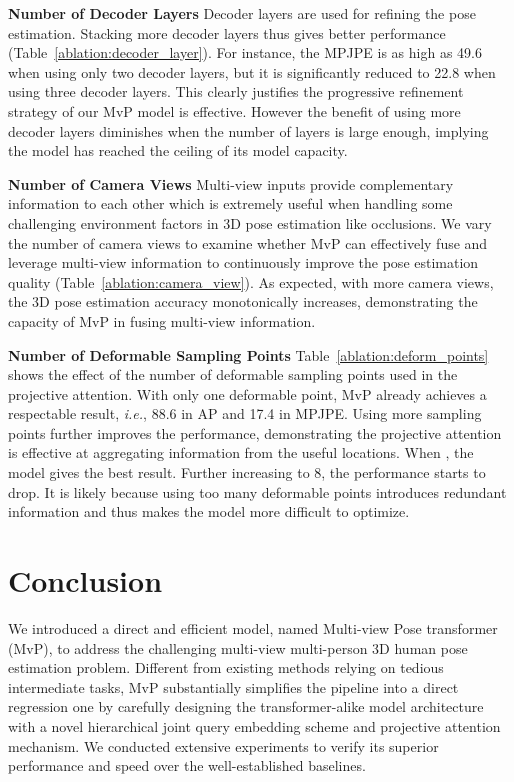 \documentclass{article}
\newcommand{\ie}{\emph{i.e.}}
\begin{document}
\textbf{Number of Decoder Layers } Decoder layers are used for refining the pose estimation.  Stacking more decoder layers thus gives better performance (Table~\ref{ablation:decoder_layer}). For instance, the MPJPE is as high as 49.6 when using only two decoder layers, but it is significantly reduced to 22.8 when using three decoder layers. This clearly justifies the progressive refinement strategy of our MvP model is effective.   However the benefit of using more decoder layers diminishes when the number of layers is large enough, implying the model has reached the ceiling of its model  capacity.


\textbf{Number of Camera Views } Multi-view inputs provide complementary information to each other which is extremely useful when 
handling some challenging environment factors in 3D pose estimation like occlusions. We vary the number of camera views to examine whether MvP can effectively fuse and leverage multi-view information to continuously improve the pose estimation quality (Table~\ref{ablation:camera_view}). 
As expected, with more camera views, the 3D pose estimation accuracy monotonically increases, demonstrating the capacity of MvP in fusing multi-view information.



\textbf{Number of Deformable Sampling Points }  Table~\ref{ablation:deform_points} shows the effect of the number of deformable sampling points  used in the projective attention. With only one deformable point, MvP already achieves a respectable result, \ie, 88.6 in AP and 17.4 in MPJPE. Using more sampling points further improves the performance, demonstrating the projective attention is effective at aggregating information from the useful locations.  When , the model gives the best result. Further increasing  to 8, the performance starts to drop. It is likely because using too many deformable points introduces redundant information and  thus makes the model more difficult to optimize. 

\section{Conclusion}
\label{sec:conclusion}
We introduced a direct and efficient model,  named Multi-view Pose transformer (MvP),  to address the challenging multi-view multi-person 3D human pose estimation problem. Different from existing methods relying on tedious intermediate tasks,  MvP substantially simplifies the pipeline into a direct regression one by carefully designing the transformer-alike model architecture with a novel hierarchical joint query embedding scheme and projective attention mechanism. We conducted extensive experiments to verify its superior performance and speed over the well-established baselines.  
\end{document}
